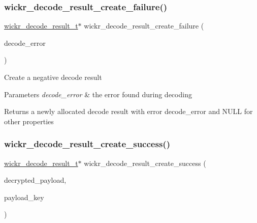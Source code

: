 \subsubsection{\texorpdfstring{wickr\+\_\+decode\+\_\+result\+\_\+create\+\_\+failure()}{wickr\_decode\_result\_create\_failure()}}
{\footnotesize\ttfamily \hyperlink{structwickr__decode__result}{wickr\+\_\+decode\+\_\+result\+\_\+t}$\ast$ wickr\+\_\+decode\+\_\+result\+\_\+create\+\_\+failure (\begin{DoxyParamCaption}\item[{wickr\+\_\+decode\+\_\+error}]{decode\+\_\+error }\end{DoxyParamCaption})}

Create a negative decode result


\begin{DoxyParams}{Parameters}
{\em decode\+\_\+error} & the error found during decoding \\
\hline
\end{DoxyParams}
\begin{DoxyReturn}{Returns}
a newly allocated decode result with error \textquotesingle{}decode\+\_\+error\textquotesingle{} and N\+U\+LL for other properties 
\end{DoxyReturn}
\mbox{\label{group__wickr__protocol_ga633aaf4cb6159be0110401f06dae458c}} 
\subsubsection{\texorpdfstring{wickr\+\_\+decode\+\_\+result\+\_\+create\+\_\+success()}{wickr\_decode\_result\_create\_success()}}
{\footnotesize\ttfamily \hyperlink{structwickr__decode__result}{wickr\+\_\+decode\+\_\+result\+\_\+t}$\ast$ wickr\+\_\+decode\+\_\+result\+\_\+create\+\_\+success (\begin{DoxyParamCaption}\item[{\hyperlink{structwickr__payload}{wickr\+\_\+payload\+\_\+t} $\ast$}]{decrypted\+\_\+payload,  }\item[{\hyperlink{structwickr__cipher__key}{wickr\+\_\+cipher\+\_\+key\+\_\+t} $\ast$}]{payload\+\_\+key }\end{DoxyParamCaption})}

